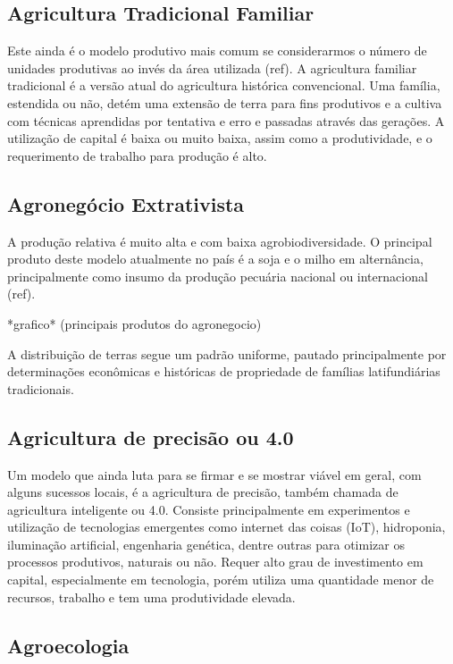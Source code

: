 \documentclass[]{article}
\begin{document}
	\subsection{Agricultura Tradicional Familiar}
	
	Este ainda é o modelo produtivo mais comum se considerarmos o número de unidades produtivas ao invés da área utilizada (ref). A agricultura familiar tradicional é a versão atual do agricultura histórica convencional. Uma família, estendida ou não, detém uma extensão de terra para fins produtivos e a cultiva com técnicas aprendidas por tentativa e erro e passadas através das gerações. A utilização de capital é baixa ou muito baixa, assim como a produtividade, e o requerimento de trabalho para produção é alto. 
	
	
	
	\subsection{Agronegócio Extrativista}
	
	A produção relativa é muito alta e com baixa agrobiodiversidade. O principal produto deste modelo atualmente no país é a soja e o milho em alternância, principalmente como insumo da produção pecuária nacional ou internacional (ref). 
	
	*grafico* (principais produtos do agronegocio) 
	
	A distribuição de terras segue um padrão uniforme, pautado principalmente por determinações econômicas e históricas de propriedade de famílias latifundiárias tradicionais. 
	
	
	\subsection{Agricultura de precisão ou 4.0}
	
	Um modelo que ainda luta para se firmar e se mostrar viável em geral, com alguns sucessos locais, é a agricultura de precisão, também chamada de agricultura inteligente ou 4.0. Consiste principalmente em experimentos e utilização de tecnologias emergentes como internet das coisas (IoT), hidroponia, iluminação artificial, engenharia genética, dentre outras para otimizar os processos produtivos, naturais ou não. Requer alto grau de investimento em capital, especialmente em tecnologia, porém utiliza uma quantidade menor de recursos, trabalho e tem uma produtividade elevada. 
	
	
	\subsection{Agroecologia}
	
\end{document}
